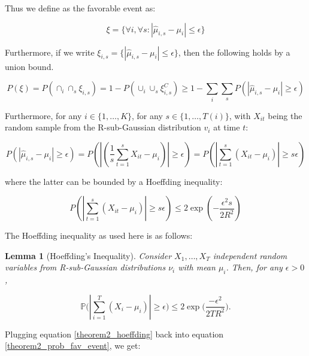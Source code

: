 \documentclass[12pt,]{article}
\newtheorem{lemma}{Lemma}
\begin{document}
Thus we define as the favorable event as:

\begin{equation} 
\xi = \{\forall i, \forall s: | \hat{\mu}_{i,s} - \mu_i | \leq
\epsilon\} 
\end{equation}

Furthermore, if we write
\(\xi_{i,s} = \{ |\hat{\mu}_{i,s}-\mu_i | \leq \epsilon \}\), then the
following holds by a union bound.

\begin{equation} 
P(\xi) = P(\cap_i \cap_s \xi_{i,s}) = 1 - P(\cup_i \cup_s
\xi_{i,s}^C) \geq 1 - \sum_i \sum_s P(| \hat{\mu}_{i,s} - \mu_i| \geq \epsilon)
\label{theorem2_prob_fav_event} 
\end{equation}

Furthermore, for any \(i \in \{1, \dots, K\}\), for any
\(s \in \{1, \dots, T(i)\}\), with \(X_{it}\) being the random sample
from the R-sub-Gaussian distribution \(v_i\) at time \(t\):

\begin{equation} 
P(| \hat{\mu}_{i,s} - \mu_i| \geq \epsilon) = P(| (\frac{1}{s}
\sum_{t=1}^{s} X_{it} - \mu_i) | \geq \epsilon) = P(| \sum_{t=1}^{s} (X_{it} -
\mu_i) | \geq s \epsilon) 
\end{equation}

where the latter can be bounded by a Hoeffding inequality:

\begin{equation} 
P(| \sum_{t=1}^{s} (X_{it} - \mu_i) | \geq s \epsilon) \leq
2\exp (-\frac{\epsilon^2 s}{2 R^2}) \label{theorem2_hoeffding} 
\end{equation}

The Hoeffding inequality as used here is as follows:

\begin{lemma}[Hoeffding's Inequality] \label{lemma:HoeffdingInequality}
Consider $X_1, \dots, X_T$ independent random variables from R-sub-Gaussian distributions $\nu_i$ with mean $\mu_i$. Then, for any $\epsilon > 0$,

\begin{equation*}
\mathbb{P} \Big( | \sum_{i = 1}^T (X_i - \mu_i) | \geq \epsilon \Big) \leq 2\exp \Big(\frac{-\epsilon^2}{2T R^2}\Big).
\end{equation*}
\end{lemma}

Plugging equation \eqref{theorem2_hoeffding} back into equation
\eqref{theorem2_prob_fav_event}, we get:
\end{document}
